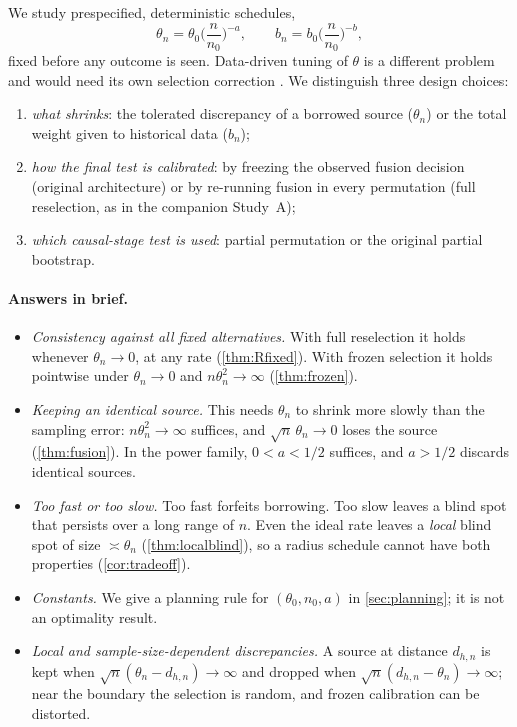 \documentclass[11pt,a4paper]{article}
\begin{document}
We study prespecified, deterministic schedules,
\[
\theta_n=\theta_0\Big(\frac{n}{n_0}\Big)^{-a},\qquad b_n=b_0\Big(\frac{n}{n_0}\Big)^{-b},
\]
fixed before any outcome is seen. Data-driven tuning of $\theta$ is a different problem and would need its own selection correction \citep[Section~3.5 of][]{yang2026}. We distinguish three design choices:
\begin{enumerate}[leftmargin=1.4em,itemsep=1pt]
\item \emph{what shrinks}: the tolerated discrepancy of a borrowed source ($\theta_n$) or the total weight given to historical data ($b_n$);
\item \emph{how the final test is calibrated}: by freezing the observed fusion decision (original architecture) or by re-running fusion in every permutation (full reselection, as in the companion Study~A);
\item \emph{which causal-stage test is used}: partial permutation or the original partial bootstrap.
\end{enumerate}

\paragraph{Answers in brief.}
\begin{itemize}[leftmargin=1.4em,itemsep=1pt]
\item \emph{Consistency against all fixed alternatives.} With full reselection it holds whenever $\theta_n\to0$, at any rate (\cref{thm:Rfixed}). With frozen selection it holds pointwise under $\theta_n\to0$ and $n\theta_n^2\to\infty$ (\cref{thm:frozen}).
\item \emph{Keeping an identical source.} This needs $\theta_n$ to shrink more slowly than the sampling error: $n\theta_n^2\to\infty$ suffices, and $\sqrt n\,\theta_n\to0$ loses the source (\cref{thm:fusion}). In the power family, $0<a<1/2$ suffices, and $a>1/2$ discards identical sources.
\item \emph{Too fast or too slow.} Too fast forfeits borrowing. Too slow leaves a blind spot that persists over a long range of $n$. Even the ideal rate leaves a \emph{local} blind spot of size $\asymp\theta_n$ (\cref{thm:localblind}), so a radius schedule cannot have both properties (\cref{cor:tradeoff}).
\item \emph{Constants.} We give a planning rule for $(\theta_0,n_0,a)$ in \cref{sec:planning}; it is not an optimality result.
\item \emph{Local and sample-size-dependent discrepancies.} A source at distance $d_{h,n}$ is kept when $\sqrt n(\theta_n-d_{h,n})\to\infty$ and dropped when $\sqrt n(d_{h,n}-\theta_n)\to\infty$; near the boundary the selection is random, and frozen calibration can be distorted.
\end{itemize}
\end{document}
